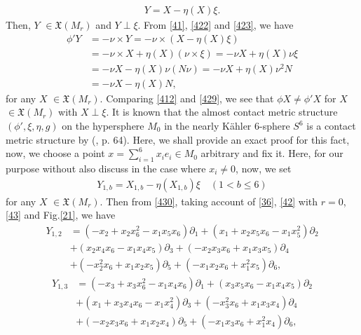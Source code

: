 \documentclass[12pt]{article}
\numberwithin{equation}{section}
\begin{document}
\begin{equation}\label{428}
\begin{split}
Y=X-\eta(X)\xi.
\end{split}
\end{equation}
Then, $Y$ $\in\mathfrak{X}(M_{r})$ and $Y \perp \xi$. From
\eqref{41}, \eqref{422} and \eqref{423}, we have
\begin{equation}\label{429}
\begin{split}
\phi 'Y&=-\nu \times Y =-\nu \times (X-\eta(X)\xi)\\
&=-\nu \times X + \eta(X)(\nu \times \xi)=-\nu X + \eta(X)\nu\xi\\
&=-\nu X-\eta(X)\nu(N\nu) = -\nu X + \eta(X)\nu^{2}N \\
&=-\nu X - \eta(X)N,
\end{split}
\end{equation}
for any $X$ $\in\mathfrak{X}(M_{r})$. Comparing \eqref{412} and
\eqref{429}, we see that $\phi X \neq \phi 'X$ for $X$
$\in\mathfrak{X}(M_{r})$ with $X \perp \xi$. It is known that the
almost contact metric structure $(\phi ', \xi, \eta, g)$ on the
hypersphere $M_0$ in the nearly {K\"ahler} 6-sphere $S^6$ is a
contact metric structure by (\cite{B1}, p. 64). Here, we shall
provide an exact proof for this fact, now, we choose a point
$x=\sum_{i=1}^6 x_ie_i \in M_0$ arbitrary and fix it. Here, for
our purpose without also discuss in the case where $x_i \neq 0$,
now, we set
\begin{equation}\label{430}
\begin{split}
Y_{1, b}=X_{1, b}-\eta(X_{1, b})\xi \quad(1<b\leq 6)
\end{split}
\end{equation}
for any $X$ $\in\mathfrak{X}(M_{r})$. Then from \eqref{430}, taking
account of \eqref{36}, \eqref{42} with $r=0$, \eqref{43} and Fig.\eqref{21},
we have
\begin{equation}\label{431}
\begin{split}
Y_{1,2}&=(-x_2+x_2x_6^2-x_1x_5x_6)\partial_1+(x_1+x_2x_5x_6-x_1x_5^2)\partial_2\\
&+(x_2x_4x_6-x_1x_4x_5)\partial_3+(-x_2x_3x_6+x_1x_3x_5)\partial_4\\
&+(-x_2^2x_6+x_1x_2x_5)\partial_5+(-x_1x_2x_6+x_1^2x_5)\partial_6,
\end{split}
\end{equation}
\begin{equation*}
\begin{split}
Y_{1,3}&=(-x_3+x_3x_6^2-x_1x_4x_6)\partial_1+(x_3x_5x_6-x_1x_4x_5)\partial_2\\
&+(x_1+x_3x_4x_6-x_1x_4^2)\partial_3+(-x_3^2x_6+x_1x_3x_4)\partial_4\\
&+(-x_2x_3x_6+x_1x_2x_4)\partial_5+(-x_1x_3x_6+x_1^2x_4)\partial_6,
\end{split}
\end{equation*}
\end{document}
